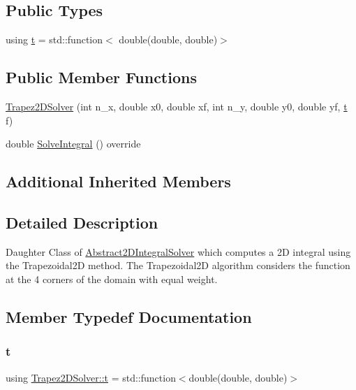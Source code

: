 \subsection*{Public Types}
\begin{DoxyCompactItemize}
\item 
using \hyperlink{class_trapez2_d_solver_a2af165a7995664482df24eec24a39ec3}{t} = std\+::function$<$ double(double, double)$>$
\end{DoxyCompactItemize}
\subsection*{Public Member Functions}
\begin{DoxyCompactItemize}
\item 
\hyperlink{class_trapez2_d_solver_a95b57f9279e40991610b4e91747d7e0d}{Trapez2\+D\+Solver} (int n\+\_\+x, double x0, double xf, int n\+\_\+y, double y0, double yf, \hyperlink{class_abstract2_d_integral_solver_ab660df32953c6b0f9f3a45a8720eaeb3}{t} f)
\item 
double \hyperlink{class_trapez2_d_solver_a88f724ff6fd2c566d54f5d0ccc500cb9}{Solve\+Integral} () override
\end{DoxyCompactItemize}
\subsection*{Additional Inherited Members}


\subsection{Detailed Description}
Daughter Class of \hyperlink{class_abstract2_d_integral_solver}{Abstract2\+D\+Integral\+Solver} which computes a 2D integral using the Trapezoidal2D method. The Trapezoidal2D algorithm considers the function at the 4 corners of the domain with equal weight. 

\subsection{Member Typedef Documentation}
\mbox{\label{class_trapez2_d_solver_a2af165a7995664482df24eec24a39ec3}} 
\subsubsection{\texorpdfstring{t}{t}}
{\footnotesize\ttfamily using \hyperlink{class_trapez2_d_solver_a2af165a7995664482df24eec24a39ec3}{Trapez2\+D\+Solver\+::t} =  std\+::function$<$double(double, double)$>$}

